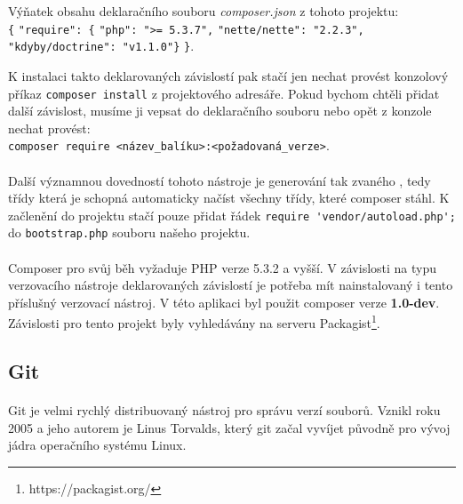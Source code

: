 \documentclass[11pt,oneside]{fithesis}
\begin{document}
        Výňatek obsahu deklaračního souboru \textit{composer.json} z tohoto projektu:\\
            \verb|{|
                \newline\verb|"require": {|
                \newline\verb|"php": ">= 5.3.7",|
                \newline\verb|"nette/nette": "2.2.3",|
                \newline\verb|"kdyby/doctrine": "v1.1.0"}|
                \newline\verb|}|.

        K instalaci takto deklarovaných závislostí pak stačí jen nechat provést konzolový příkaz \verb|composer install| z projektového adresáře. Pokud bychom chtěli přidat další závislost, musíme ji vepsat do deklaračního souboru nebo opět z konzole nechat provést: \\ \verb|composer require <název_balíku>:<požadovaná_verze>|.

        \paragraph*{}
        Další významnou dovedností tohoto nástroje je generování tak zvaného , tedy třídy která je schopná automaticky načíst všechny třídy, které composer stáhl. K začlenění do projektu stačí pouze přidat řádek \verb|require 'vendor/autoload.php';| do \verb|bootstrap.php| souboru našeho projektu.

        \paragraph*{}
        Composer pro svůj běh vyžaduje PHP verze 5.3.2 a vyšší. V závislosti na typu verzovacího nástroje deklarovaných závislostí je potřeba mít nainstalovaný i tento příslušný verzovací nástroj. V této aplikaci byl použit composer verze \textbf{1.0-dev}. Závislosti pro tento projekt byly vyhledávány na serveru Packagist\footnote{https://packagist.org/}.

        \subsection{Git}
        \paragraph*{}
        Git je velmi rychlý distribuovaný nástroj pro správu verzí souborů. Vznikl roku 2005 a jeho autorem je Linus Torvalds, který git začal vyvíjet původně pro vývoj jádra operačního systému Linux.
\end{document}
